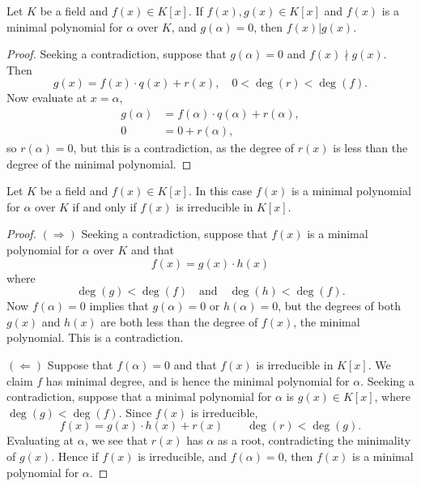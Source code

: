 \documentclass{ximera}
\begin{document}
\begin{lemma}
  Let $K$ be a field and $f(x)\in K[x]$. If $f(x),g(x)\in K[x]$ and
  $f(x)$ is a minimal polynomial for $\alpha$ over $K$, and $g(\alpha)
  = 0$, then $f(x) | g(x)$.
  \begin{proof}
    Seeking a contradiction, suppose that $g(\alpha) = 0$ and $f(x)
    \nmid g(x)$. Then
    \[
    g(x) = f(x) \cdot q(x) + r(x), \quad 0<\deg(r)< \deg(f).
    \]
    Now evaluate at $x = \alpha$,
    \begin{align*}
      g(\alpha) &= f(\alpha) \cdot q(\alpha) + r(\alpha),\\
      0 &= 0 + r(\alpha),
    \end{align*}
    so $r(\alpha)=0$, but this is a contradiction, as the degree of
    $r(x)$ is less than the degree of the minimal polynomial.
  \end{proof}
\end{lemma}

\begin{lemma}\label{L:ipi}
  Let $K$ be a field and $f(x)\in K[x]$. In this case $f(x)$ is a
  minimal polynomial for $\alpha$ over $K$ if and only if $f(x)$ is
  irreducible in $K[x]$.
  \begin{proof}
    $(\Rightarrow)$ Seeking a contradiction, suppose that $f(x)$ is a
    minimal polynomial for $\alpha$ over $K$ and that
    \[
    f(x) = g(x) \cdot h(x) 
    \]
    where
    \[
    \deg(g) <\deg(f)\quad\text{and}\quad\deg(h) <\deg(f).
    \]
    Now $f(\alpha) = 0$ implies that $g(\alpha) =0$ or $h(\alpha) =
    0$, but the degrees of both $g(x)$ and $h(x)$ are both less than
    the degree of $f(x)$, the minimal polynomial. This is a
    contradiction.

    $(\Leftarrow)$ Suppose that $f(\alpha) = 0$ and that $f(x)$ is
    irreducible in $K[x]$. We claim $f$ has minimal degree, and is
    hence the minimal polynomial for $\alpha$. Seeking a
    contradiction, suppose that a minimal polynomial for $\alpha$ is
    $g(x)\in K[x]$, where $\deg(g) < \deg(f)$. Since $f(x)$ is irreducible,
    \[
    f(x) = g(x) \cdot h(x) + r(x) \qquad \deg(r)<\deg(g).
    \]
    Evaluating at $\alpha$, we see that $r(x)$ has $\alpha$ as a root,
    contradicting the minimality of $g(x)$. Hence if $f(x)$ is
    irreducible, and $f(\alpha) = 0$, then $f(x)$ is a minimal
    polynomial for $\alpha$.
  \end{proof}
\end{lemma}
\end{document}
